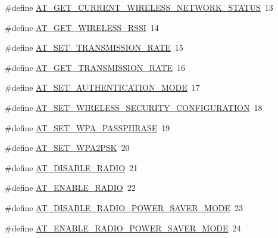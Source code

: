 \begin{DoxyCompactItemize}
\item 
\#define \hyperlink{group__wireless__interface_ga122c64b7081b10eecebcc50f0c23a220}{A\+T\+\_\+\+G\+E\+T\+\_\+\+C\+U\+R\+R\+E\+N\+T\+\_\+\+W\+I\+R\+E\+L\+E\+S\+S\+\_\+\+N\+E\+T\+W\+O\+R\+K\+\_\+\+S\+T\+A\+T\+US}~13
\item 
\#define \hyperlink{group__wireless__interface_gafdc5154c3f102e6959536bc384c03420}{A\+T\+\_\+\+G\+E\+T\+\_\+\+W\+I\+R\+E\+L\+E\+S\+S\+\_\+\+R\+S\+SI}~14
\item 
\#define \hyperlink{group__wireless__interface_gaa47446fe17b0f63ff45b40c5a4c6ba1f}{A\+T\+\_\+\+S\+E\+T\+\_\+\+T\+R\+A\+N\+S\+M\+I\+S\+S\+I\+O\+N\+\_\+\+R\+A\+TE}~15
\item 
\#define \hyperlink{group__wireless__interface_ga3a7895a03de540287912366190323978}{A\+T\+\_\+\+G\+E\+T\+\_\+\+T\+R\+A\+N\+S\+M\+I\+S\+S\+I\+O\+N\+\_\+\+R\+A\+TE}~16
\item 
\#define \hyperlink{group__wireless__interface_ga44275ab1498350eaa96a3d3a4ad68348}{A\+T\+\_\+\+S\+E\+T\+\_\+\+A\+U\+T\+H\+E\+N\+T\+I\+C\+A\+T\+I\+O\+N\+\_\+\+M\+O\+DE}~17
\item 
\#define \hyperlink{group__wireless__interface_ga920008c7b3d1555a17f2ce7849900638}{A\+T\+\_\+\+S\+E\+T\+\_\+\+W\+I\+R\+E\+L\+E\+S\+S\+\_\+\+S\+E\+C\+U\+R\+I\+T\+Y\+\_\+\+C\+O\+N\+F\+I\+G\+U\+R\+A\+T\+I\+ON}~18
\item 
\#define \hyperlink{group__wireless__interface_ga25d635c524b958723017cf47a2d788d5}{A\+T\+\_\+\+S\+E\+T\+\_\+\+W\+P\+A\+\_\+\+P\+A\+S\+S\+P\+H\+R\+A\+SE}~19
\item 
\#define \hyperlink{group__wireless__interface_gaef6a3159dd44338b506208e01e8df5f2}{A\+T\+\_\+\+S\+E\+T\+\_\+\+W\+P\+A2\+P\+SK}~20
\item 
\#define \hyperlink{group__wireless__interface_gae82f56305b52269a509ad13ea65732a1}{A\+T\+\_\+\+D\+I\+S\+A\+B\+L\+E\+\_\+\+R\+A\+D\+IO}~21
\item 
\#define \hyperlink{group__wireless__interface_ga1cfce4edbe11d8203db9c1faf109bd52}{A\+T\+\_\+\+E\+N\+A\+B\+L\+E\+\_\+\+R\+A\+D\+IO}~22
\item 
\#define \hyperlink{group__wireless__interface_gabf9491b5371b9aadf5c6bea501229667}{A\+T\+\_\+\+D\+I\+S\+A\+B\+L\+E\+\_\+\+R\+A\+D\+I\+O\+\_\+\+P\+O\+W\+E\+R\+\_\+\+S\+A\+V\+E\+R\+\_\+\+M\+O\+DE}~23
\item 
\#define \hyperlink{group__wireless__interface_gad0b00d08dd0b3d34072d3b29b43efd75}{A\+T\+\_\+\+E\+N\+A\+B\+L\+E\+\_\+\+R\+A\+D\+I\+O\+\_\+\+P\+O\+W\+E\+R\+\_\+\+S\+A\+V\+E\+R\+\_\+\+M\+O\+DE}~24
\item 

\end{DoxyCompactItemize}

